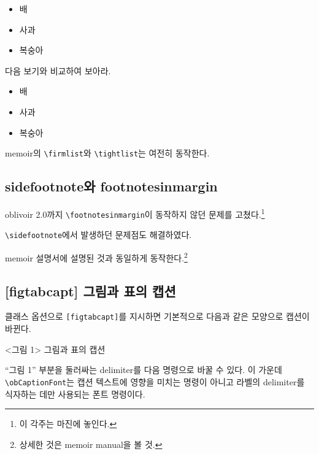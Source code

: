 \documentclass[
	12pt,
	a4paper,
	kosection,
	footnote,
	nobookmarks,
	microtype,
	figtabcapt,
]{oblivoir}
\begin{document}
\begin{itemize}\oblivoirlist
\item 배
\item 사과
\item 복숭아
\end{itemize}

다음 보기와 비교하여 보아라.

\begin{itemize}
\item 배
\item 사과
\item 복숭아
\end{itemize}

\textsf{memoir}의 \verb|\firmlist|와 \verb|\tightlist|는 여전히 동작한다.

\subsection{sidefootnote와 footnotesinmargin}

\footnotesinmargin
oblivoir 2.0까지 \verb|\footnotesinmargin|이 동작하지 않던 문제를 고쳤다.\footnote{이 각주는 마진에 놓인다.} 

\verb|\sidefootnote|에서 발생하던 문제점도 해결하였다.

\footnotesatfoot
\textsf{memoir} 설명서에 설명된 것과 동일하게 동작한다.\footnote{상세한 것은 memoir manual을 볼 것.}

\subsection{[figtabcapt] 그림과 표의 캡션}

클래스 옵션으로 \texttt{[figtabcapt]}를 지시하면 기본적으로 다음과 같은 모양으로 캡션이 바뀐다.

\begin{boxedverbatim}
\caption{그림과 표의 캡션}
\end{boxedverbatim}
\begin{minipage}{\linewidth}
\centering
<그림 1> \quad 그림과 표의 캡션
\end{minipage}

\medskip

``그림 1'' 부분을 둘러싸는 delimiter를 다음 명령으로 바꿀 수 있다. 이 가운데
\verb|\obCaptionFont|는 캡션 텍스트에 영향을 미치는 명령이 아니고 라벨의 delimiter를
식자하는 데만 사용되는 폰트 명령이다.
\begin{boxedverbatim}
\renewcommand*\obCaptionnameOpen{[}
\renewcommand*\obCaptionnameClose{]}
\obCaptionFont{\sffamily\bfseries}
\end{boxedverbatim}
\renewcommand*\obCaptionnameOpen{[}
\renewcommand*\obCaptionnameClose{]}
\obCaptionFont{\sffamily}
\end{document}

